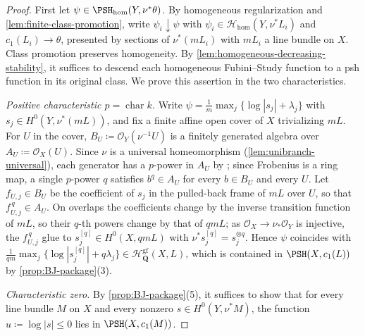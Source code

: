 \documentclass[11pt,a4paper]{article}
\newcommand{\PSHhom}{\PSH_{\mathrm{hom}}}          %
\begin{document}
\begin{proof}
First let $\psi\in\PSHhom(Y,\nu^*\theta)$. By homogeneous regularization and \cref{lem:finite-class-promotion}, write $\psi_i\downarrow\psi$ with $\psi_i\in\mathcal H_{\mathrm{hom}}(Y,\nu^*L_i)$ and $c_1(L_i)\to\theta$, presented by sections of $\nu^*(mL_i)$ with $mL_i$ a line bundle on $X$. Class promotion preserves homogeneity. By \cref{lem:homogeneous-decreasing-stability}, it suffices to descend each homogeneous Fubini--Study function to a psh function in its original class. We prove this assertion in the two characteristics.

\emph{Positive characteristic $p=\operatorname{char}k$.} Write $\psi=\frac1m\max_j\{\log|s_j|+\lambda_j\}$ with $s_j\in H^0(Y,\nu^*(mL))$, and fix a finite affine open cover of $X$ trivializing $mL$. For $U$ in the cover, $B_U\coloneqq\mathcal O_Y(\nu^{-1}U)$ is a finitely generated algebra over $A_U\coloneqq\mathcal O_X(U)$. Since $\nu$ is a universal homeomorphism (\cref{lem:unibranch-universal}), each generator has a $p$-power in $A_U$ by \cite[\href{https://stacks.math.columbia.edu/tag/0CNF}{Tag 0CNF}]{Stacks}; since Frobenius is a ring map, a single $p$-power $q$ satisfies $b^q\in A_U$ for every $b\in B_U$ and every $U$. Let $f_{U,j}\in B_U$ be the coefficient of $s_j$ in the pulled-back frame of $mL$ over $U$, so that $f_{U,j}^{\,q}\in A_U$. On overlaps the coefficients change by the inverse transition function of $mL$, so their $q$-th powers change by that of $qmL$; as $\mathcal O_X\to\nu_*\mathcal O_Y$ is injective, the $f_{U,j}^{\,q}$ glue to $s_j^{[q]}\in H^0(X,qmL)$ with $\nu^*s_j^{[q]}=s_j^{\otimes q}$. Hence $\psi$ coincides with $\frac1{qm}\max_j\{\log|s_j^{[q]}|+q\lambda_j\}\in\mathcal{H}^{\mathrm{gf}}_{\mathbf{Q}}(X,L)$, which is contained in $\PSH(X,c_1(L))$ by \cref{prop:BJ-package}(3).

\emph{Characteristic zero.} By \cref{prop:BJ-package}(5), it suffices to show that for every line bundle $M$ on $X$ and every nonzero $s\in H^0(Y,\nu^*M)$, the function $u\coloneqq\log|s|\leq0$ lies in $\PSH(X,c_1(M))$.


\end{proof}
\end{document}
